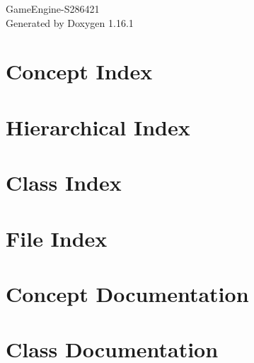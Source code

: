 \documentclass[twoside]{book}
\newcommand{\+}{\discretionary{\mbox{\scriptsize$\hookleftarrow$}}{}{}}
\newcommand{\clearemptydoublepage}{%
    \newpage{\pagestyle{empty}\cleardoublepage}%
  }
\begin{document}
  \raggedbottom
    \hypersetup{pageanchor=false,
                bookmarksnumbered=true,
                pdfencoding=unicode
               }
  \begin{titlepage}
  \vspace*{7cm}
  \begin{center}%
  {\Large Game\+Engine-\/\+S286421}\\
  \vspace*{1cm}
  {\large Generated by Doxygen 1.16.1}\\
  \end{center}
  \end{titlepage}
  \clearemptydoublepage
  \tableofcontents
  \clearemptydoublepage
  \hypersetup{pageanchor=true}
\chapter{Concept Index}

\chapter{Hierarchical Index}

\chapter{Class Index}

\chapter{File Index}

\chapter{Concept Documentation}

\chapter{Class Documentation}




































\end{document}
